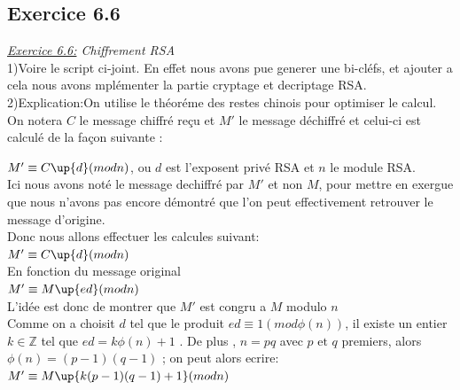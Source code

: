 \documentclass[10pt]{beamer}
\begin{document}
\begin{frame}
\section{Exercice 6.6}

\emph{\underline{Exercice 6.6:} Chiffrement RSA}
\\1)Voire le script ci-joint. En effet nous avons pue generer une bi-cl\'{e}fs, et ajouter a cela nous avons mpl\'{e}menter la partie cryptage et decriptage RSA.
\\2)Explication:On utilise le th\'{e}or\'{e}me des restes chinois pour optimiser le calcul.
\\On notera $C$ le message chiffr\'{e} re\c{c}u et $M'$ le message d\'{e}chiffr\'{e} et celui-ci est calcul\'{e} de la fa\c{c}on suivante :

$M' \equiv C\up{d} (mod n)$, ou $d$ est l'exposent priv\'{e} RSA et $n$ le module RSA.
\\Ici nous avons not\'{e} le message dechiffr\'{e} par $M'$ et non $M$, pour mettre en exergue que nous n'avons pas encore d\'{e}montr\'{e} que l'on peut effectivement retrouver le message d'origine.
\\Donc nous allons effectuer les calcules suivant:
\\$M' \equiv C\up{d} (mod n)$
\\En fonction du message original
\\$M' \equiv M\up{ed} (mod n)$
\\L'id\'{e}e est donc de montrer que $M'$ est congru a $M$ modulo $n$
\\Comme on a choisit $d$ tel que le produit $ed \equiv 1 (mod \phi{(n)})$, il existe un entier $k \in \mathbb{Z}$ tel que $ed = k \phi{(n)} + 1$ . De plus , $n = pq$ avec $p \text{ et } q$ premiers, alors $\phi{(n)} = (p-1)(q-1)$ ; on peut alors ecrire:
\\$M' \equiv M\up{k(p-1)(q-1)+1} (mod n)$


\end{frame}
\end{document}
